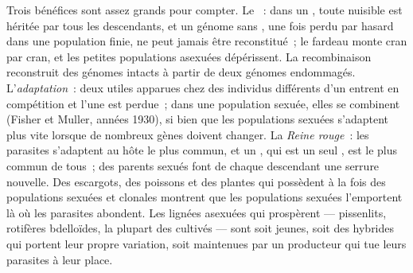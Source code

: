 \begin{proposition}\label{prop:b2:asexual-reproduction:whysex}
Trois bénéfices sont assez grands pour compter. Le \emph{}~: dans un , toute  nuisible est héritée par tous
les descendants, et un génome sans , une fois perdu par hasard
dans une population finie, ne peut jamais être reconstitué~; le fardeau
monte cran par cran, et les petites populations asexuées dépérissent.
La recombinaison reconstruit des génomes intacts à partir de deux
génomes endommagés. L'\emph{adaptation}~: deux  utiles
apparues chez des individus différents d'un  entrent en compétition
et l'une est perdue~; dans une population sexuée, elles se combinent
(Fisher et Muller, années 1930), si bien que les populations sexuées
s'adaptent plus vite lorsque de nombreux gènes doivent changer. La
\emph{Reine rouge}~: les parasites s'adaptent au  hôte le plus
commun, et un , qui est un seul , est le plus commun de
tous~; des parents sexués font de chaque descendant une serrure
nouvelle. Des escargots, des poissons et des plantes qui possèdent à la
fois des populations sexuées et clonales montrent que les populations
sexuées l'emportent là où les parasites abondent. Les lignées asexuées
qui prospèrent --- pissenlits, rotifères bdelloïdes, la plupart des
 cultivés --- sont soit jeunes, soit des hybrides  qui
portent leur propre variation, soit maintenues par un producteur qui tue
leurs parasites à leur place.
\end{proposition}

